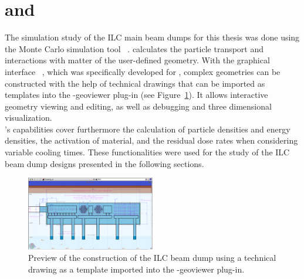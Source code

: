 \section{\fluka and \flair}
\label{BeamDumps:fluka}
The simulation study of the ILC main beam dumps for this thesis was done using the Monte Carlo simulation tool \fluka~\cite{FLUKA,FLUKA2}.
\fluka calculates the particle transport and interactions with matter of the user-defined geometry.
With the graphical interface \flair~\cite{FLAIR}, which was specifically developed for \fluka, complex geometries can be constructed with the help of technical drawings that can be imported as templates into the \flair-geoviewer plug-in (see Figure~\ref{fig:BeamDumps:geoviewer}).
It allows interactive geometry viewing and editing, as well as debugging and three dimensional visualization.
\\\fluka's capabilities cover furthermore the calculation of particle densities and energy densities, the activation of material, and the residual dose rates when considering variable cooling times.
These functionalities were used for the study of the ILC beam dump designs presented in the following sections.
\begin{figure}[hbp]
\centering
\includegraphics[width=0.5\textwidth]{Figures/BeamDump/Design2_geometry_drawing_xz.png}
\caption[Preview of the geometry construction in \flair]{Preview of the construction of the ILC beam dump using a technical drawing as a template imported into the \flair-geoviewer plug-in.}
\label{fig:BeamDumps:geoviewer}
\end{figure}

